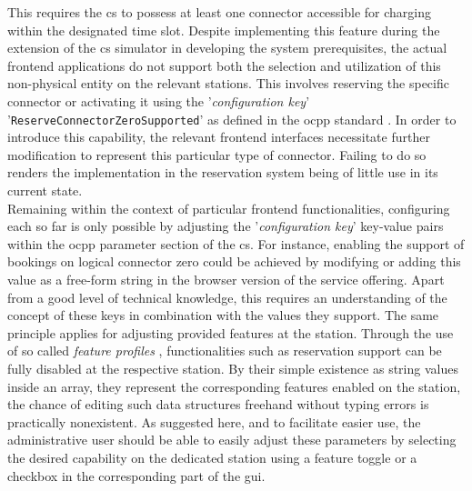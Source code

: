 This requires the \acrshort{cs} to possess at least one connector accessible for charging within the designated time slot.
Despite implementing this feature during the extension of the \acrshort{cs} simulator in developing the system prerequisites, the actual frontend applications do not support both the selection and utilization of this non-physical entity on the relevant stations.
This involves reserving the specific connector or activating it using the '\textit{configuration key}' '\texttt{ReserveConnectorZeroSupported}' as defined in the \acrshort{ocpp} standard \cite{noauthor_ocpp_nodate-1}.
In order to introduce this capability, the relevant frontend interfaces necessitate further modification to represent this particular type of connector. Failing to do so renders the implementation in the reservation system being of little use in its current state. \\
Remaining within the context of particular frontend functionalities, configuring each  so far is only possible by adjusting the '\textit{configuration key}' key-value pairs within the \acrshort{ocpp} parameter section of the \acrshort{cs}.
For instance, enabling the support of bookings on logical connector zero could be achieved by modifying or adding this value as a free-form string in the browser version of the service offering. 
Apart from a good level of technical knowledge, this requires an understanding of the concept of these keys in combination with the values they support. 
The same principle applies for adjusting provided features at the station. Through the use of so called \textit{feature profiles} \cite{noauthor_ocpp_nodate-1}, functionalities such as reservation support can be fully disabled at the respective station.
By their simple existence as string values inside an array, they represent the corresponding features enabled on the station, the chance of editing such data structures freehand without typing errors is practically nonexistent.
As suggested here, and to facilitate easier use, the administrative user should be able to easily adjust these parameters by selecting the desired capability on the dedicated station using a feature toggle or a checkbox in the corresponding part of the \acrshort{gui}. \\
